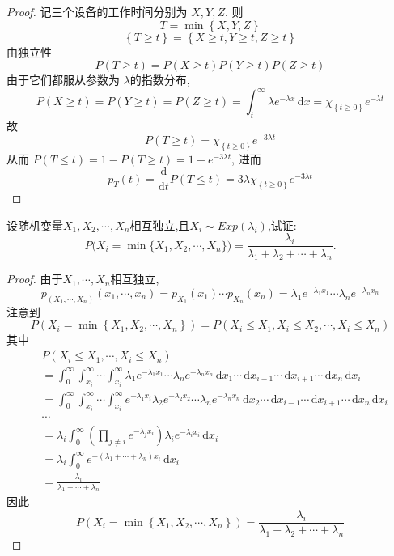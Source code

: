 \documentclass[../main.tex]{subfiles}
\begin{document}
\begin{proof}
  记三个设备的工作时间分别为 \(  X,Y,Z  \).  则 \[
  T= \min \left\{ X,Y,Z \right\}
  \]  \[
  \left\{ T\ge t \right\}= \left\{ X\ge t, Y\ge t,Z\ge t \right\}
  \]由独立性 \[
  P\left( T\ge t \right) = P\left( X\ge t \right)P\left( Y\ge t \right)P\left( Z\ge t \right)   
  \]由于它们都服从参数为 \(   \lambda   \)的指数分布,  \[
  P\left( X\ge t \right)= P\left( Y\ge t \right)= P\left( Z\ge t \right)= \int_{t}^{\infty} \lambda e^{- \lambda x}\,\mathrm{d} x=\chi _{\left\{ t\ge 0 \right\}} e^{- \lambda t}   
  \] 故 \[
  P\left( T\ge t \right) = \chi _{\left\{ t\ge 0 \right\}}e^{-3 \lambda t}
  \]从而 \(  P\left( T\le t \right)= 1-P\left( T\ge t \right)= 1-e^{-3 \lambda t}    \), 进而 \[
  p_{T}\left( t \right)= \frac{\mathrm{d}}{\mathrm{d}t}P\left( T\le t \right)= 3 \lambda \chi _{\left\{ t\ge 0 \right\}}e^{-3 \lambda t}  
  \] 
\end{proof}
\begin{exercise}{}{}
设随机变量\(X_1,X_2,\cdots,X_n\)相互独立,且\(X_i\sim Exp(\lambda_i)\),试证:
\[
P\bigl(X_i=\min\{X_1,X_2,\cdots,X_n\}\bigr)
=\frac{\lambda_i}{\lambda_1+\lambda_2+\cdots+\lambda_n}.
\]
\end{exercise}
\begin{proof}
   由于\(  X_1,\cdots ,X_{n}  \)相互独立, \[
   p_{\left( X_1,\cdots ,X_{n} \right) }\left( x_1,\cdots ,x_{n} \right)= p_{X_1}\left( x_1 \right)\cdots p_{X_{n}}\left( x_{n} \right)=   \lambda _1 e^{- \lambda _1 x_1}\cdots  \lambda _{n}e^{- \lambda _{n}x_{n}}
   \]注意到\[
   P\left( X_{i}= \min \left\{ X_1,X_2,\cdots ,X_{n} \right\} \right)= P\left( X_{i}\le X_1,X_{i}\le X_2,\cdots ,X_{i}\le X_{n} \right)  
   \]其中 \[
  \begin{aligned}
  & P\left( X_i\le X_1,\cdots ,X_{i}\le X_{n} \right)\\ 
   &= \int_{0}^{\infty}\int_{x_{i}}^{\infty}\cdots \int_{x_{i}}^{\infty} \lambda _1 e^{- \lambda _1 x_1}\cdots  \lambda _{n}e^{- \lambda _{n}x_{n}}\,\mathrm{d} x_1\cdots \,\mathrm{d} x_{i-1}\cdots \,\mathrm{d} x_{i+ 1}\cdots \,\mathrm{d} x_{n}\,\mathrm{d} x_{i}\\ 
    &=  \int_{0}^{\infty}\int_{x_{i}}^{\infty}\cdots \int_{x_{i}}^{\infty}e^{- \lambda _1 x_{i}} \lambda _2 e^{- \lambda _2 x_2}\cdots  \lambda _{n}e^{- \lambda _{n}x_{n}}\,\mathrm{d} x_2\cdots \,\mathrm{d} x_{i-1}\cdots \,\mathrm{d} x_{i+ 1}\cdots \,\mathrm{d} x_{n}\,\mathrm{d} x_{i}\\ 
     &\cdots \\ 
      &=  \lambda _{i}\int_{0}^{\infty}\left( \prod _{j\neq i}e^{- \lambda _{j}x_{i}} \right) \lambda _{i}e^{- \lambda _{i}x_{i}} \,\mathrm{d} x_{i}\\
       &=  \lambda _{i}\int_{0}^{\infty}e^{-\left(  \lambda _1 + \cdots +  \lambda _{n} \right)x_{i} }\,\mathrm{d} x_{i}\\ 
        &= \frac{ \lambda _{i} }{ \lambda _1 + \cdots +  \lambda _{n} } 
  \end{aligned}
   \]因此 \[
   P\left( X_{i}= \min \left\{ X_1,X_2,\cdots ,X_{n} \right\} \right)= \frac{ \lambda _{i} }{ \lambda _1 +  \lambda _2 + \cdots +  \lambda _{n} }  
   \]
\end{proof}
\end{document}

